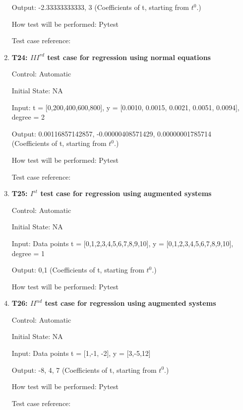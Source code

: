 \documentclass[12pt, titlepage]{article}
\begin{document}
\begin{enumerate}
Output: -2.33333333333, 3 (Coefficients of t, starting from $t^{0}$.)

How test will be performed: Pytest

Test case reference: ~\cite{RegNormal}\\


\item{\textbf{T24: ${III}^{rd}$ test case for regression using normal equations 
}\\}

Control: Automatic

Initial State: NA

Input: t = [0,200,400,600,800], y = [0.0010, 0.0015, 0.0021, 0.0051, 0.0094], degree = 2

Output: 0.00116857142857, -0.00000408571429, 0.00000001785714 (Coefficients of t, starting from $t^{0}$.)

How test will be performed: Pytest

Test case reference:~\cite{RegNormal}\\



\item{\textbf{T25: $I^{st}$ test case for regression using augmented systems}\\}

Control: Automatic

Initial State: NA

Input: Data points t = [0,1,2,3,4,5,6,7,8,9,10], y = [0,1,2,3,4,5,6,7,8,9,10], degree = 1 

Output: 0,1 (Coefficients of t, starting from $t^{0}$.)

How test will be performed: Pytest\\

\item{\textbf{T26: ${II}^{nd}$ test case for regression using augmented 
systems}\\}

Control: Automatic

Initial State: NA

Input: Data points t = [1,-1, -2], y = [3,-5,12] 

Output: -8, 4, 7 (Coefficients of t, starting from $t^{0}$.)

How test will be performed: Pytest

Test case reference: \cite{RegAugmented}\\



\end{enumerate}
\end{document}
